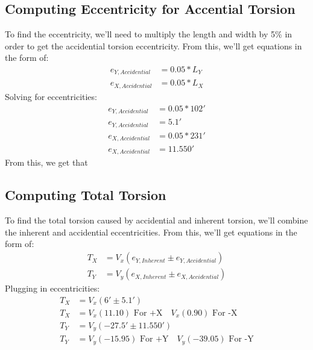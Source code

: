 \documentclass{report} %
\begin{document}
\subsection*{Computing Eccentricity for Accential Torsion}
To find the eccentricity, we'll need to multiply the length and width by 5\% in order to get the accidential torsion eccentricity. From this, we'll get equations in the form of:
\begin{equation*}
    \begin{aligned}
        e_{Y,Accidential} &= 0.05 * L_Y \\
        e_{X,Accidential} &= 0.05 * L_X 
    \end{aligned}
\end{equation*}
Solving for eccentricities:
\begin{equation*}
    \begin{aligned}
        e_{Y,Accidential} &= 0.05 * 102' \\
        e_{Y,Accidential} &= 5.1' \\
        e_{X,Accidential} &= 0.05 * 231' \\
        e_{X,Accidential} &= 11.550'
    \end{aligned}
\end{equation*}
From this, we get that  \\

\subsection*{Computing Total Torsion}
To find the total torsion caused by accidential and inherent torsion, we'll combine the inherent and accidential eccentricities. From this, we'll get equations in the form of:
\begin{equation*}
    \begin{aligned}
        T_X &= V_x (e_{Y,Inherent} \pm e_{Y,Accidential}) \\
        T_Y &= V_y (e_{X,Inherent} \pm e_{X,Accidential}) 
    \end{aligned}
\end{equation*}
Plugging in eccentricities:
\begin{equation*}
    \begin{aligned}
        T_X &= V_x (6' \pm 5.1') \\
        T_X &= V_x (11.10) \text{ For +X} \quad V_x (0.90) \text{ For -X} \\
        T_Y &= V_y (-27.5' \pm 11.550') \\
        T_Y &= V_y (-15.95) \text{ For +Y} \quad V_y (-39.05) \text{ For -Y}
    \end{aligned}
\end{equation*}
    
\end{document}

